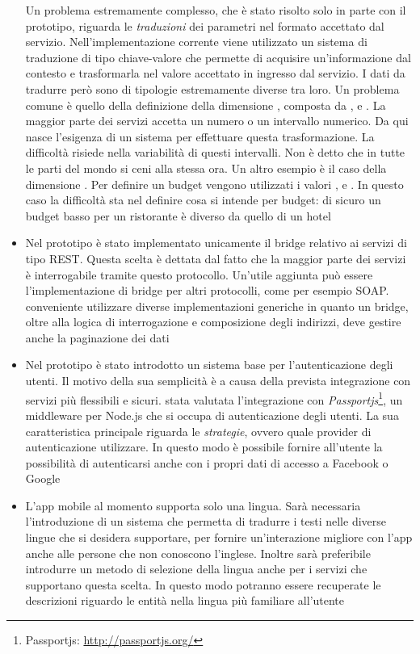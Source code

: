 \begin{itemize}
	Un problema estremamente complesso, che è stato risolto solo in parte con il prototipo, riguarda le \emph{traduzioni} dei parametri nel formato accettato dal servizio. Nell'implementazione corrente viene utilizzato un sistema di traduzione di tipo chiave-valore che permette di acquisire un'informazione dal contesto e trasformarla nel valore accettato in ingresso dal servizio. I dati da tradurre però sono di tipologie estremamente diverse tra loro. Un problema comune è quello della definizione della dimensione , composta da ,  e . La maggior parte dei servizi accetta un numero o un intervallo numerico. Da qui nasce l'esigenza di un sistema per effettuare questa trasformazione. La difficoltà risiede nella variabilità di questi intervalli. Non è detto che in tutte le parti del mondo si ceni alla stessa ora. Un altro esempio è il caso della dimensione . Per definire un budget vengono utilizzati i valori ,  e . In questo caso la difficoltà sta nel definire cosa si intende per budget: di sicuro un budget basso per un ristorante è diverso da quello di un hotel
	\item
	Nel prototipo è stato implementato unicamente il bridge relativo ai servizi di tipo REST. Questa scelta è dettata dal fatto che la maggior parte dei servizi è interrogabile tramite questo protocollo. Un'utile aggiunta può essere l'implementazione di bridge per altri protocolli, come per esempio SOAP. \upe conveniente utilizzare diverse implementazioni generiche in quanto un bridge, oltre alla logica di interrogazione e composizione degli indirizzi, deve gestire anche la paginazione dei dati
	\item
	Nel prototipo è stato introdotto un sistema base per l'autenticazione degli utenti. Il motivo della sua semplicità è a causa della prevista integrazione con servizi più flessibili e sicuri. \upe stata valutata l'integrazione con \emph{Passportjs}\footnote{Passportjs: \url{http://passportjs.org/}}, un middleware per Node.js che si occupa di autenticazione degli utenti. La sua caratteristica principale riguarda le \emph{strategie}, ovvero quale provider di autenticazione utilizzare. In questo modo è possibile fornire all'utente la possibilità di autenticarsi anche con i propri dati di accesso a Facebook o Google
	\item
	L'app mobile al momento supporta solo una lingua. Sarà necessaria l'in\-tro\-du\-zio\-ne di un sistema che permetta di tradurre i testi nelle diverse lingue che si desidera supportare, per fornire un'interazione migliore con l'app anche alle persone che non conoscono l'inglese. Inoltre sarà preferibile introdurre un metodo di selezione della lingua anche per i servizi che supportano questa scelta. In questo modo potranno essere recuperate le descrizioni riguardo le entità nella lingua più familiare all'utente

\end{itemize}
